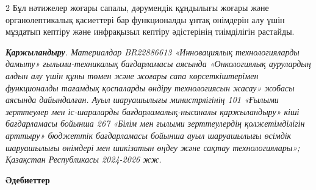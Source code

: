 \begin{multicols}{2}
Бұл нәтижелер жоғары сапалы, дәрумендік құндылығы жоғары және
органолептикалық қасиеттері бар функционалды ұнтақ өнімдерін алу үшін
мұздатып кептіру және инфрақызыл кептіру әдістерінің тиімділігін
растайды.

\emph{{\bfseries Қаржыландыру}. Материалдар BR22886613 «Инновациялық
технологияларды дамыту» ғылыми-техникалық бағдарламасы аясында
«Онкологиялық аурулардың алдын алу үшін құны төмен және жоғары сапа
көрсеткіштерімен функционалды тағамдық қоспаларды өндіру технологиясын
жасау» жобасы аясында дайындалған. Ауыл шаруашылығы министрлігінің 101
«Ғылыми зерттеулер мен іс-шараларды бағдарламалық-нысаналы қаржыландыру»
кіші бағдарламасы бойынша 267 «Білім мен ғылыми зерттеулердің
қолжетімділігін арттыру» бюджеттік бағдарламасы бойынша ауыл шаруашылығы
өсімдік шаруашылығы өнімдері мен шикізатын өңдеу және сақтау
технологиялары»; Қазақстан Республикасы 2024-2026 жж.}
\end{multicols}

\begin{center}
{\bfseries Әдебиеттер}
\end{center}

